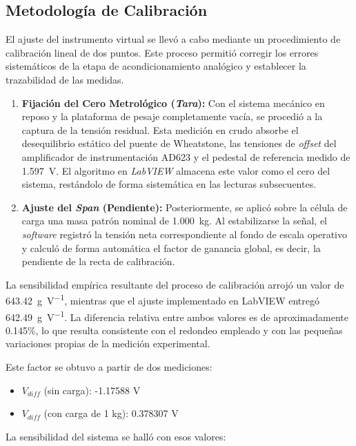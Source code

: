\subsection{Metodología de Calibración}

El ajuste del instrumento virtual se llevó a cabo mediante un procedimiento de calibración lineal de dos puntos. Este proceso permitió corregir los errores sistemáticos de la etapa de acondicionamiento analógico y establecer la trazabilidad de las medidas.

\begin{enumerate}
    \item \textbf{Fijación del Cero Metrológico (\textit{Tara}):} Con el sistema mecánico en reposo y la plataforma de pesaje completamente vacía, se procedió a la captura de la tensión residual. Esta medición en crudo absorbe el desequilibrio estático del puente de Wheatstone, las tensiones de \textit{offset} del amplificador de instrumentación AD623 y el pedestal de referencia medido de \SI{1.597}{\V}. El algoritmo en \textit{LabVIEW} almacena este valor como el cero del sistema, restándolo de forma sistemática en las lecturas subsecuentes.

    \item \textbf{Ajuste del \textit{Span} (Pendiente):} Posteriormente, se aplicó sobre la célula de carga una masa patrón nominal de \SI{1.000}{\kg}. Al estabilizarse la señal, el \textit{software} registró la tensión neta correspondiente al fondo de escala operativo y calculó de forma automática el factor de ganancia global, es decir, la pendiente de la recta de calibración.
\end{enumerate}

La sensibilidad empírica resultante del proceso de calibración arrojó un valor de \SI{643.42}{\g\per\V}, mientras que el ajuste implementado en LabVIEW entregó \SI{642.49}{\g\per\V}. La diferencia relativa entre ambos valores es de aproximadamente 0.145\%, lo que resulta consistente con el redondeo empleado y con las pequeñas variaciones propias de la medición experimental.

Este factor se obtuvo a partir de dos mediciones:

\begin{itemize}
    \item $V_{diff}$ (sin carga): -1.17588 \si{V}
    \item $V_{diff}$ (con carga de 1 \si{kg}): 0.378307 \si{V}
\end{itemize}

La sensibilidad del sistema se halló con esos valores:

